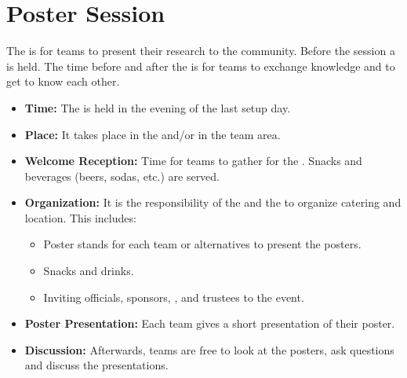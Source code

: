 \section{Poster Session}
\label{sec:setupdays:postersession}
The \PS{} is for teams to present their research to the \AtHome{} community. Before the session a \WelcomeReception{} is held. The time before and after the \PS{} is for teams to exchange knowledge and to get to know each other.
\begin{itemize}
	\item \textbf{Time:} The \PS{} is held in the evening of the last setup day.
	\item \textbf{Place:} It takes place in the \Arena{} and/or in the team area.
	\item \textbf{Welcome Reception:} Time for teams to gather for the \PS{}. Snacks and beverages (beers, sodas, etc.) are served.
	\item \textbf{Organization:} It is the responsibility of the  and the  to organize catering and location. This includes:
		\begin{itemize}
			\item Poster stands for each team or alternatives to present the posters.
			\item Snacks and drinks.
			\item Inviting officials, sponsors, , and \RCF{} trustees to the event.
		\end{itemize}
	\item \textbf{Poster Presentation:} Each team gives a short presentation of their poster.
	\item \textbf{Discussion:} Afterwards, teams are free to look at the posters, ask questions and discuss the presentations.
\end{itemize}

